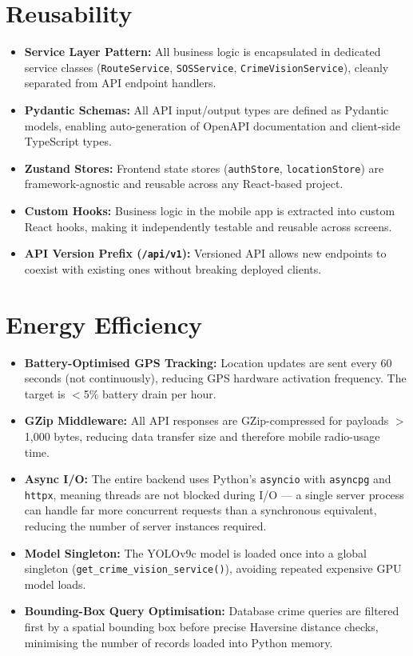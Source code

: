 \documentclass[12pt,a4paper]{report}
\begin{document}
\section{Reusability}
\begin{itemize}[leftmargin=*]
    \item \textbf{Service Layer Pattern:} All business logic is encapsulated in dedicated service classes (\texttt{RouteService}, \texttt{SOSService}, \texttt{CrimeVisionService}), cleanly separated from API endpoint handlers.
    \item \textbf{Pydantic Schemas:} All API input/output types are defined as Pydantic models, enabling auto-generation of OpenAPI documentation and client-side TypeScript types.
    \item \textbf{Zustand Stores:} Frontend state stores (\texttt{authStore}, \texttt{locationStore}) are framework-agnostic and reusable across any React-based project.
    \item \textbf{Custom Hooks:} Business logic in the mobile app is extracted into custom React hooks, making it independently testable and reusable across screens.
    \item \textbf{API Version Prefix (\texttt{/api/v1}):} Versioned API allows new endpoints to coexist with existing ones without breaking deployed clients.
\end{itemize}

\section{Energy Efficiency}
\begin{itemize}[leftmargin=*]
    \item \textbf{Battery-Optimised GPS Tracking:} Location updates are sent every 60 seconds (not continuously), reducing GPS hardware activation frequency. The target is $<$5\% battery drain per hour.
    \item \textbf{GZip Middleware:} All API responses are GZip-compressed for payloads $>$1,000 bytes, reducing data transfer size and therefore mobile radio-usage time.
    \item \textbf{Async I/O:} The entire backend uses Python's \texttt{asyncio} with \texttt{asyncpg} and \texttt{httpx}, meaning threads are not blocked during I/O — a single server process can handle far more concurrent requests than a synchronous equivalent, reducing the number of server instances required.
    \item \textbf{Model Singleton:} The YOLOv9c model is loaded once into a global singleton (\texttt{get\_crime\_vision\_service()}), avoiding repeated expensive GPU model loads.
    \item \textbf{Bounding-Box Query Optimisation:} Database crime queries are filtered first by a spatial bounding box before precise Haversine distance checks, minimising the number of records loaded into Python memory.
\end{itemize}
\end{document}
